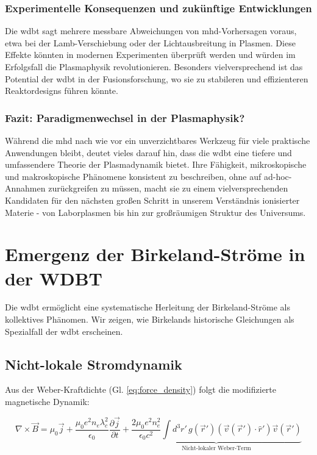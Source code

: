 \subsubsection{Experimentelle Konsequenzen und zukünftige Entwicklungen}
Die \gls{wdbt} sagt mehrere messbare Abweichungen von \gls{mhd}-Vorhersagen voraus, etwa bei der Lamb-Verschiebung oder der Lichtausbreitung in Plasmen. Diese Effekte könnten in
modernen Experimenten überprüft werden und würden im Erfolgsfall die Plasmaphysik revolutionieren. Besonders vielversprechend ist das Potential der \gls{wdbt} in der
Fusionsforschung, wo sie zu stabileren und effizienteren Reaktordesigns führen könnte.

\subsubsection{Fazit: Paradigmenwechsel in der Plasmaphysik?}
Während die \gls{mhd} nach wie vor ein unverzichtbares Werkzeug für viele praktische Anwendungen bleibt, deutet vieles darauf hin, dass die \gls{wdbt} eine tiefere und umfassendere
Theorie der Plasmadynamik bietet. Ihre Fähigkeit, mikroskopische und makroskopische Phänomene konsistent zu beschreiben, ohne auf ad-hoc-Annahmen zurückgreifen zu müssen, macht
sie zu einem vielversprechenden Kandidaten für den nächsten großen Schritt in unserem Verständnis ionisierter Materie - von Laborplasmen bis hin zur großräumigen Struktur des
Universums.

\section{Emergenz der Birkeland-Ströme in der WDBT}
\label{sec:birkeland_emergence}

Die \gls{wdbt} ermöglicht eine systematische Herleitung der Birkeland-Ströme als kollektives Phänomen. Wir zeigen, wie Birkelands historische Gleichungen als Spezialfall der \gls{wdbt}
erscheinen.

\subsection{Nicht-lokale Stromdynamik}
Aus der Weber-Kraftdichte (Gl. \ref{eq:force_density}) folgt die modifizierte magnetische Dynamik:

\begin{equation}
    \label{eq:full_ampere}
    \nabla \times \vec{B} = \mu_0\vec{j} + \frac{\mu_0 e^2 n_e \lambda_c^2}{\epsilon_0} \frac{\partial \vec{j}}{\partial t} + \underbrace{\frac{2\mu_0 e^2 n_e^2}{\epsilon_0 c^2} \int d^3r'\, g(\vec{r}')(\vec{v}(\vec{r}')\cdot\hat{r}')\vec{v}(\vec{r}')}_{\text{Nicht-lokaler Weber-Term}}
\end{equation}


